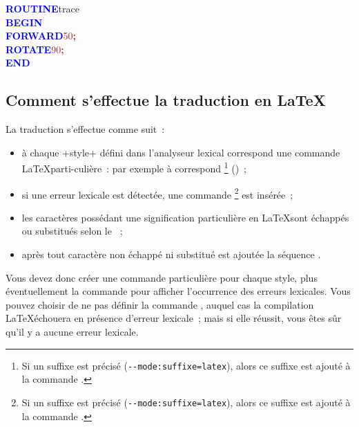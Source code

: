 {

\begin{siderulesRed}
\ttfamily
\textcolor{blue}{\bf ROUTINE}\hspace*{.6em}t{}r{}a{}c{}e{} \\
\textcolor{blue}{\bf BEGIN} \\
\hspace*{1.2em}\textcolor{blue}{\bf FORWARD}\hspace*{.6em}\textcolor{brown}{5{}0{}}\textcolor{brown}{\bf ;} \\
\hspace*{1.2em}\textcolor{blue}{\bf ROTATE}\hspace*{.6em}\textcolor{brown}{9{}0{}}\textcolor{brown}{\bf ;} \\
\textcolor{blue}{\bf END}
\end{siderulesRed}
}

\subsection{Comment s'effectue la traduction en \LaTeX}

La traduction s'effectue comme suit~:
\begin{itemize}
  \item à chaque \ggsq+style+ défini dans l'analyseur lexical correspond une commande \LaTeX parti-culière~: par exemple à  correspond \footnote{Si un suffixe est précisé (\texttt{-{}-mode{}:suffixe=latex}), alors ce suffixe est ajouté à la commande .} ()~;
  \item si une erreur lexicale est détectée, une commande \footnote{Si un suffixe est précisé (\texttt{-{}-mode{}:suffixe=latex}), alors ce suffixe est ajouté à la commande .} est insérée~;
  \item les caractères possédant une signification particulière en \LaTeX sont échappés ou substitués selon le ~;
  \item après tout caractère non échappé ni substitué est ajoutée la séquence \tpp{\{\}}.
\end{itemize}

Vous devez donc créer une commande particulière pour chaque style, plus éventuellement la commande  pour afficher l'occurrence des erreurs lexicales. Vous pouvez choisir de ne pas définir la commande , auquel cas la compilation \LaTeX échouera en présence d'erreur lexicale~; mais si elle réussit, vous êtes sûr qu'il y a aucune erreur lexicale.

